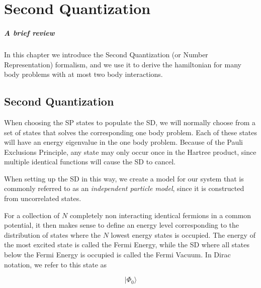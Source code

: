 
\chapter{Second Quantization} %

\label{Chapter2} %



\paragraph{A brief review} In this chapter we introduce the Second Quantization (or Number Representation) formalism, and we use it to derive the hamiltonian for many body problems with at most two body interactions.

\section{Second Quantization}

When choosing the SP states to populate the SD, we will normally choose from a set of states that solves the corresponding one body problem. Each of these states will have an energy eigenvalue in the one body problem. Because of the Pauli Exclusions Principle, any state may only occur once in the Hartree product, since multiple identical functions will cause the SD to cancel. 

When setting up the SD in this way, we create a model for our system that is commonly referred to as an \emph{independent particle model}, since it is constructed from uncorrelated states.

For a collection of $N$ completely non interacting identical fermions in a common potential, it then makes sense to define an energy level corresponding to the distribution of states where the $N$ lowest energy states is occupied. The energy of the most excited state is called the Fermi Energy, while the SD where all states below the Fermi Energy is occupied is called the Fermi Vacuum. In Dirac notation, we refer to this state as \cite{ShavittBartlett2009}

\begin{equation}
 \vert \Phi_0 \rangle 
\label{eqn:fermivacuum}
\end{equation}

